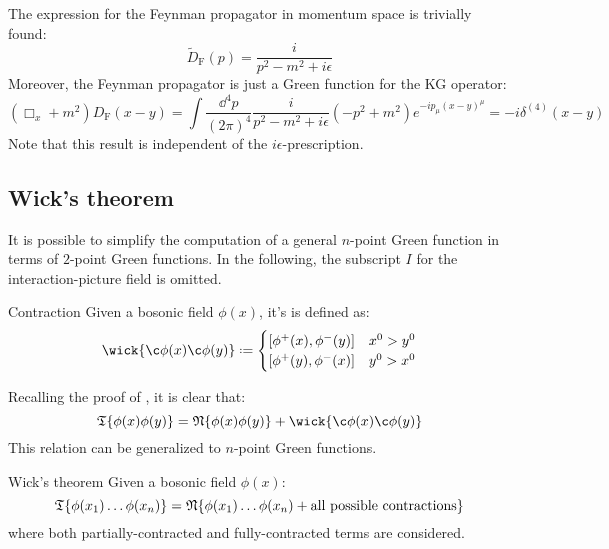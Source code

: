 The expression for the Feynman propagator in momentum space is trivially found:
\begin{equation}
  \tilde{D}_\text{F}(p) = \frac{i}{p^2 - m^2 + i\epsilon}
\end{equation}
Moreover, the Feynman propagator is just a Green function for the KG operator:
\begin{equation*}
  (\Box_x + m^2) D_\text{F}(x-y) = \int \frac{\dd^4p}{(2\pi)^4} \frac{i}{p^2 - m^2 + i\epsilon} (-p^2 + m^2) e^{-i p_\mu (x-y)^\mu} = -i \delta^{(4)}(x-y)
\end{equation*}
Note that this result is independent of the $ i\epsilon $-prescription.

\subsection{Wick's theorem}

It is possible to simplify the computation of a general $ n $-point Green function in terms of $ 2 $-point Green functions. In the following, the subscript $ I $ for the interaction-picture field is omitted.

\begin{definition}{Contraction}{}
  Given a bosonic field $ \phi(x) $, it's  is defined as:
  \begin{equation}
    \wick{\c\phi(x) \c\phi(y)} \defeq
    \begin{cases}
      [\phi^+(x) , \phi^-(y)] & x^0 > y^0 \\
      [\phi^+(y) , \phi^-(x)] & y^0 > x^0
    \end{cases}
  \end{equation}
\end{definition}

Recalling the proof of , it is clear that:
\begin{equation}
  \tempord\{\phi(x) \phi(y)\} = \normord\{\phi(x) \phi(y)\} + \wick{\c\phi(x) \c\phi(y)}
  \label{eq:wick-th-2}
\end{equation}
This relation can be generalized to $ n $-point Green functions.

\begin{theorem}{Wick's theorem}{}
  Given a bosonic field $ \phi(x) $:
  \begin{equation}
    \mathfrak{T}\{\phi(x_1) \dots \phi(x_n)\} = \mathfrak{N}\{\phi(x_1) \dots \phi(x_n) + \text{all possible contractions}\}
    \label{eq:wick-th}
  \end{equation}
  where both partially-contracted and fully-contracted terms are considered.
\end{theorem}

